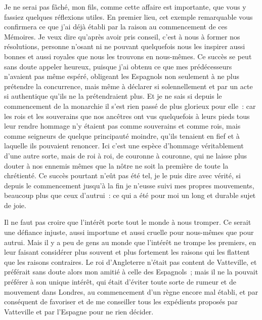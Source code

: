 \documentclass[french,twoside]{book} %
\begin{document}
Je ne serai pas fâché, mon fils, comme cette affaire est importante, que vous y fassiez quelques réflexions utiles. En premier lieu, cet exemple remarquable vous confirmera ce que j’ai déjà établi par la raison au commencement de ces Mémoires. Je veux dire qu’après avoir pris conseil, c’est à nous à former nos résolutions, personne n’osant ni ne pouvant quelquefois nous les inspirer aussi bonnes et aussi royales que nous les trouvons en nous-mêmes. Ce succès se peut sans doute appeler heureux, puisque j’ai obtenu ce que mes prédécesseurs n’avaient pas même espéré, obligeant les Espagnols non seulement à ne plus prétendre la concurrence, mais même à déclarer si solennellement et par un acte si authentique qu’ils ne la prétendraient plus. Et je ne sais si depuis le commencement de la monarchie il s’est rien passé de plus glorieux pour elle : car les rois et les souverains que nos ancêtres ont vus quelquefois à leurs pieds tous leur rendre hommage n’y étaient pas comme souverains et comme rois, mais comme seigneurs de quelque principauté moindre, qu’ils tenaient en fief et à laquelle ils pouvaient renoncer. Ici c’est une espèce d’hommage véritablement d’une autre sorte, mais de roi à roi, de couronne à couronne, qui ne laisse plus douter à nos ennemis mêmes que la nôtre ne soit la première de toute la chrétienté. Ce succès pourtant n’eût pas été tel, je le puis dire avec vérité, si depuis le commencement jusqu’à la fin je n’eusse suivi mes propres mouvements, beaucoup plus que ceux d’autrui : ce qui a été pour moi un long et durable sujet de joie.\par
Il ne faut pas croire que l’intérêt porte tout le monde à nous tromper. Ce serait une défiance injuste, aussi importune et aussi cruelle pour nous-mêmes que pour autrui. Mais il y a peu de gens au monde que l’intérêt ne trompe les premiers, en leur faisant considérer plus souvent et plus fortement les raisons qui les flattent que les raisons contraires. Le roi d’Angleterre n’était pas content de Vatteville, et préférait sans doute alors mon amitié à celle des Espagnols ; mais il ne la pouvait préférer à son unique intérêt, qui était d’éviter toute sorte de rumeur et de mouvement dans Londres, au commencement d’un règne encore mal établi, et par conséquent de favoriser et de me conseiller tous les expédients proposés par Vatteville et par l’Espagne pour ne rien décider.\par
\end{document}
